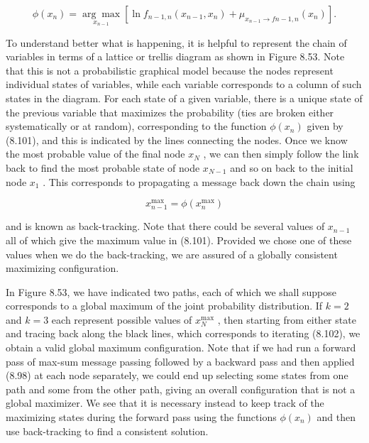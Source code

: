 \documentclass[
  10
]{article}
\begin{document}
\[
\phi (x _ {n}) = \underset {x _ {n - 1}} {\arg \max} \left[ \ln f _ {n - 1, n} (x _ {n - 1}, x _ {n}) + \mu_ {x _ {n - 1} \to f n - 1, n} (x _ {n}) \right].\tag{8.101}
\]

To understand better what is happening, it is helpful to represent the
chain of variables in terms of a lattice or trellis diagram as shown in
Figure 8.53. Note that this is not a probabilistic graphical model
because the nodes represent individual states of variables, while each
variable corresponds to a column of such states in the diagram. For each
state of a given variable, there is a unique state of the previous
variable that maximizes the probability (ties are broken either
systematically or at random), corresponding to the function
\(\phi ( x _ { n } )\) given by (8.101), and this is indicated by the
lines connecting the nodes. Once we know the most probable value of the
final node \(x _ { N }\) , we can then simply follow the link back to
find the most probable state of node \(x _ { N - 1 }\) and so on back to
the initial node \(x _ { 1 }\) . This corresponds to propagating a
message back down the chain using

\[
x _ {n - 1} ^ {\mathrm{max}} = \phi (x _ {n} ^ {\mathrm{max}})\tag{8.102}
\]

and is known as back-tracking. Note that there could be several values
of \(x _ { n - 1 }\) all of which give the maximum value in (8.101).
Provided we chose one of these values when we do the back-tracking, we
are assured of a globally consistent maximizing configuration.

In Figure 8.53, we have indicated two paths, each of which we shall
suppose corresponds to a global maximum of the joint probability
distribution. If \(k = 2\) and \(k = 3\) each represent possible values
of \(x _ { N } ^ { \mathrm { m a x } }\) , then starting from either
state and tracing back along the black lines, which corresponds to
iterating (8.102), we obtain a valid global maximum configuration. Note
that if we had run a forward pass of max-sum message passing followed by
a backward pass and then applied (8.98) at each node separately, we
could end up selecting some states from one path and some from the other
path, giving an overall configuration that is not a global maximizer. We
see that it is necessary instead to keep track of the maximizing states
during the forward pass using the functions \(\phi ( x _ { n } )\) and
then use back-tracking to find a consistent solution.
\end{document}
